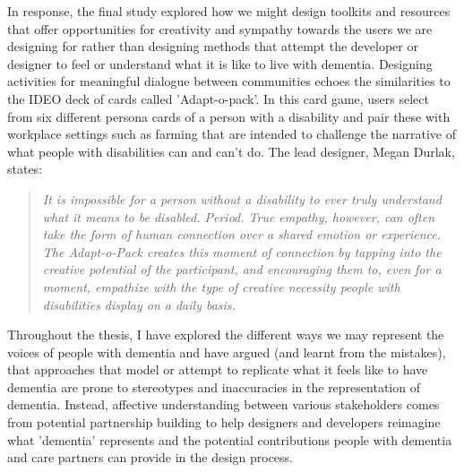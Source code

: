 In response, the final study explored how we might design toolkits and resources that offer opportunities for creativity and sympathy towards the users we are designing for rather than designing methods that attempt the developer or designer to feel or understand what it is like to live with dementia. Designing activities for meaningful dialogue between communities echoes the similarities to the IDEO deck of cards called 'Adapt-o-pack'. In this card game, users select from six different persona cards of a person with a disability and pair these with workplace settings such as farming that are intended to challenge the narrative of what people with disabilities can and can't do. The lead designer, Megan Durlak, states:

\begin{quote}
\textit{
It is impossible for a person without a disability to ever truly understand what it means to be disabled. Period. True empathy, however, can often take the form of human connection over a shared emotion or experience. The Adapt-o-Pack creates this moment of connection by tapping into the creative potential of the participant, and encouraging them to, even for a moment, empathize with the type of creative necessity people with disabilities display on a daily basis.
} \citep{durlak}
\end{quote}

Throughout the thesis, I have explored the different ways we may represent the voices of people with dementia and have argued (and learnt from the mistakes), that approaches that model or attempt to replicate what it feels like to have dementia are prone to stereotypes and inaccuracies in the representation of dementia. Instead, affective understanding between various stakeholders comes from potential partnership building to help designers and developers reimagine what 'dementia' represents and the potential contributions people with dementia and care partners can provide in the design process. 

